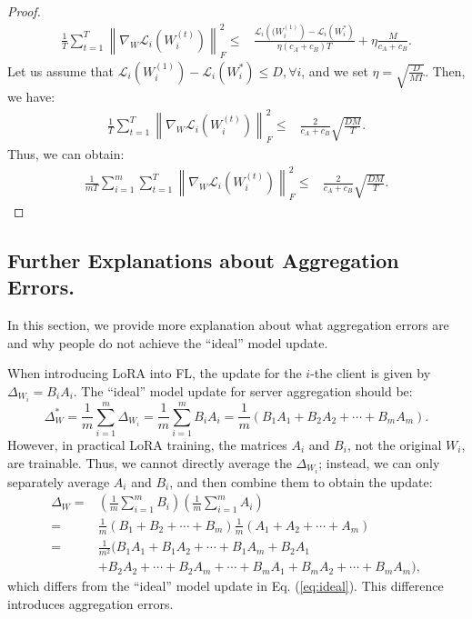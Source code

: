 \begin{proof}
\begin{align}
\frac{1}{T}\sum_{t=1}^T\left\|\nabla_{W}\mathcal{L}_i(W_i^{(t)})\right\|_F^2 
\leq & \frac{\mathcal{L}_i\left((W_i^{(1)}\right)-\mathcal{L}_i\left(W_i^{*}\right)}{\eta(c_A+c_B)T}+\eta \frac{M}{c_A+c_B}.
\end{align}
Let us assume that $\mathcal{L}_i(W_i^{(1)})-\mathcal{L}_i(W_i^{*}) \leq D, \forall i$, and we set $\eta = \sqrt{\frac{D}{MT}}$. Then, we have:
\begin{align}\label{main-ineq-6}
\frac{1}{T}\sum_{t=1}^T\left\|\nabla_{W}\mathcal{L}_i(W_i^{(t)})\right\|_F^2 
\leq & \frac{2}{c_A+c_B}\sqrt{\frac{DM}{T}}.
\end{align}
Thus, we can obtain:
\begin{align}\label{main-ineq-7}
\frac{1}{mT}\sum_{i=1}^m \sum_{t=1}^T\left\|\nabla_{W}\mathcal{L}_i(W_i^{(t)})\right\|_F^2 
\leq & \frac{2}{c_A+c_B}\sqrt{\frac{DM}{T}}.
\end{align}
\end{proof}

\subsection{Further Explanations about Aggregation Errors.} \label{app_sec:aggregation_error}

In this section, we provide more explanation about what aggregation errors are and why people do not achieve the ``ideal'' model update.

When introducing LoRA into FL, the update for the $i$-the client is given by $\Delta_{W_i} =  B_i A_i$. The ``ideal'' model update for server aggregation should be:
\begin{equation} \label{eq:ideal}
\Delta_{W}^* = \frac{1}{m}\sum_{i=1}^{m}\Delta_{W_i} = \frac{1}{m}\sum_{i=1}^{m}B_i A_i = \frac{1}{m}(B_1A_1 + B_2A_2 + \cdots + B_mA_m). 
\end{equation}
However, in practical LoRA training, the matrices $A_i$ and $B_i$, not the original $W_i$, are trainable. Thus, we cannot directly average the $\Delta_{W_i}$; instead, we can only separately average $A_i$ and $B_i$, and then combine them to obtain the update: 
\begin{equation}
\begin{aligned}
\Delta_{W} = & (\frac{1}{m}\sum_{i=1}^{m}B_i) (\frac{1}{m}\sum_{i=1}^{m}A_i) \\ 
= & \frac{1}{m}(B_1 + B_2 + \cdots + B_m)\frac{1}{m}(A_1 + A_2 + \cdots + A_m) \\
= & \frac{1}{m^2} (B_1A_1 + B_1A_2 + \cdots + B_1A_m + B_2A_1 \\
& + B_2A_2 + \cdots + B_2A_m + \cdots + B_mA_1 + B_mA_2 + \cdots + B_mA_m),
\end{aligned}
\end{equation}
which differs from the ``ideal'' model update in Eq. (\ref{eq:ideal}). This difference introduces aggregation errors.

